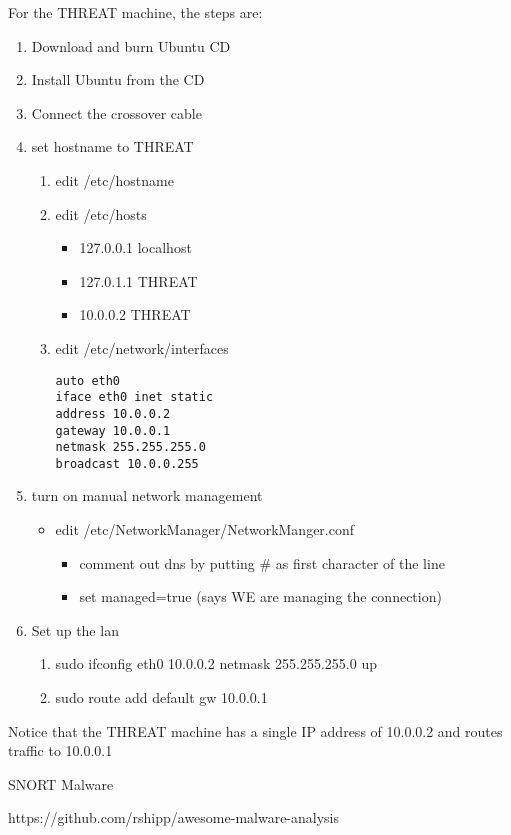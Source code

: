 \documentclass[dvipdfm]{book}
\begin{document}
For the THREAT machine, the steps are:
\begin{enumerate}
\item Download and burn Ubuntu CD
\item Install Ubuntu from the CD
\item Connect the crossover cable
\item set hostname to THREAT
\begin{enumerate}
\item edit /etc/hostname
\item edit /etc/hosts
\begin{itemize}
\item 127.0.0.1 localhost
\item 127.0.1.1 THREAT
\item 10.0.0.2  THREAT
\end{itemize}
\item edit /etc/network/interfaces
\begin{verbatim}
auto eth0
iface eth0 inet static
address 10.0.0.2
gateway 10.0.0.1
netmask 255.255.255.0
broadcast 10.0.0.255
\end{verbatim}
\end{enumerate}
\item turn on manual network management 
\begin{itemize}
\item edit /etc/NetworkManager/NetworkManger.conf
\begin{itemize}
\item comment out dns by putting \# as first character of the line
\item set managed=true  (says WE are managing the connection)
\end{itemize}
\end{itemize}
\item Set up the lan
\begin{enumerate}
\item sudo ifconfig eth0 10.0.0.2 netmask 255.255.255.0 up
\item sudo route add default gw 10.0.0.1
\end{enumerate}
\end{enumerate}
Notice that the THREAT machine has a single IP address of 10.0.0.2
and routes traffic to 10.0.0.1

SNORT Malware

https://github.com/rshipp/awesome-malware-analysis
\end{document}
